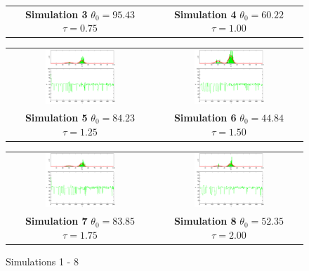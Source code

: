 \begin{figure}
\begin{tabular}{cc}
\textbf{Simulation 3} $\theta_0=   95.43$  $\tau=    0.75$  & \textbf{Simulation 4} $\theta_0=   60.22$  $\tau=    1.00$
\end{tabular}
\begin{tabular}{cc} 
\includegraphics[width=0.5\textwidth]{ImaginiLatex/MetropolisExample5.eps} &
\includegraphics[width=0.5\textwidth]{ImaginiLatex/MetropolisExample6.eps} \\
\textbf{Simulation 5} $\theta_0=   84.23$  $\tau=    1.25$  & \textbf{Simulation 6} $\theta_0=   44.84$  $\tau=    1.50$
\end{tabular}
\begin{tabular}{cc} 
\includegraphics[width=0.5\textwidth]{ImaginiLatex/MetropolisExample7.eps} &
\includegraphics[width=0.5\textwidth]{ImaginiLatex/MetropolisExample8.eps} \\
\textbf{Simulation 7} $\theta_0=   83.85$  $\tau=    1.75$  & \textbf{Simulation 8} $\theta_0=   52.35$  $\tau=    2.00$
\end{tabular}
\caption{Simulations 1 - 8}
\end{figure}
